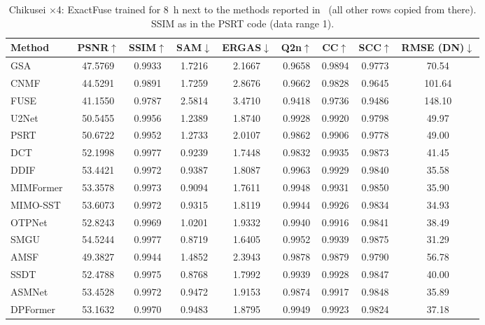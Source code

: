 \documentclass[10pt,twocolumn,letterpaper]{article}
\begin{document}
\begin{table}[t]
\centering
\caption{Chikusei $\times$4: ExactFuse trained for 8~h next to the methods reported in~\cite{chen2026twostage} (all other rows copied from there). SSIM as in the PSRT code (data range 1).}
\label{tab:main}
\begin{tabular}{@{}lcccccccc@{}}
\toprule
Method & PSNR$\uparrow$ & SSIM$\uparrow$ & SAM$\downarrow$ & ERGAS$\downarrow$ & Q2n$\uparrow$ & CC$\uparrow$ & SCC$\uparrow$ & RMSE (DN)$\downarrow$ \\
\midrule
GSA~\cite{aiazzi2007gsa} & 47.5769 & 0.9933 & 1.7216 & 2.1667 & 0.9658 & 0.9894 & 0.9773 & 70.54 \\
CNMF~\cite{yokoya2012cnmf} & 44.5291 & 0.9891 & 1.7259 & 2.8676 & 0.9662 & 0.9828 & 0.9645 & 101.64 \\
FUSE~\cite{wei2015fuse} & 41.1550 & 0.9787 & 2.5814 & 3.4710 & 0.9418 & 0.9736 & 0.9486 & 148.10 \\
U2Net~\cite{peng2023u2net} & 50.5455 & 0.9956 & 1.2389 & 1.8740 & 0.9928 & 0.9920 & 0.9798 & 49.97 \\
PSRT~\cite{deng2023psrt} & 50.6722 & 0.9952 & 1.2733 & 2.0107 & 0.9862 & 0.9906 & 0.9778 & 49.00 \\
DCT~\cite{ma2024reciprocal} & 52.1998 & 0.9977 & 0.9239 & 1.7448 & 0.9832 & 0.9935 & 0.9873 & 41.45 \\
DDIF~\cite{cao2024ddif} & 53.4421 & 0.9972 & 0.9387 & 1.8087 & 0.9963 & 0.9929 & 0.9840 & 35.58 \\
MIMFormer~\cite{li2024mimformer} & 53.3578 & 0.9973 & 0.9094 & 1.7611 & 0.9948 & 0.9931 & 0.9850 & 35.90 \\
MIMO-SST~\cite{fang2024mimosst} & 53.6073 & 0.9972 & 0.9315 & 1.8119 & 0.9944 & 0.9926 & 0.9834 & 34.93 \\
OTPNet~\cite{yu2025otpnet} & 52.8243 & 0.9969 & 1.0201 & 1.9332 & 0.9940 & 0.9916 & 0.9841 & 38.49 \\
SMGU~\cite{yan2025smgu} & 54.5244 & 0.9977 & 0.8719 & 1.6405 & 0.9952 & 0.9939 & 0.9875 & 31.29 \\
AMSF~\cite{liu2025amsf} & 49.3827 & 0.9944 & 1.4852 & 2.3943 & 0.9878 & 0.9879 & 0.9790 & 56.78 \\
SSDT~\cite{fu2025ssdt} & 52.4788 & 0.9975 & 0.8768 & 1.7992 & 0.9939 & 0.9928 & 0.9847 & 40.00 \\
ASMNet~\cite{liu2025asmnet} & 53.4528 & 0.9972 & 0.9472 & 1.9153 & 0.9874 & 0.9917 & 0.9848 & 35.89 \\
DPFormer~\cite{liu2026dpformer} & 53.1632 & 0.9970 & 0.9483 & 1.8795 & 0.9949 & 0.9923 & 0.9824 & 37.18 \\

\end{tabular}
\end{table}
\end{document}
